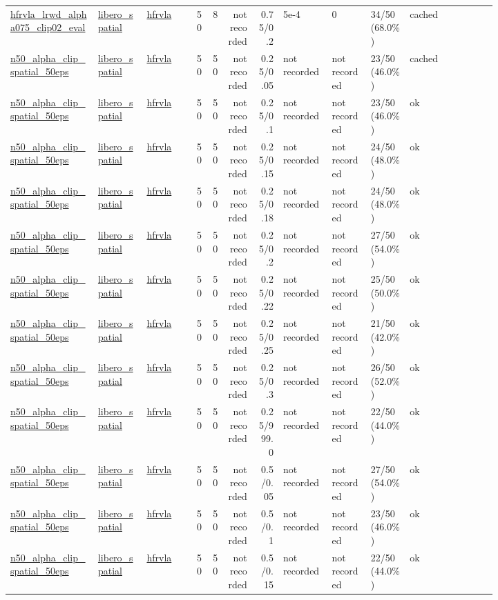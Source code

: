 \begin{tiny}
\begin{longtable}{@{}p{0.18\linewidth}p{0.10\linewidth}p{0.10\linewidth}rrrrp{0.10\linewidth}p{0.08\linewidth}p{0.08\linewidth}p{0.11\linewidth}p{0.07\linewidth}@{}}
\url{hfrvla_lrwd_alpha075_clip02_eval} & \url{libero_spatial} & \url{hfrvla} & 50 & 8 & not recorded & 0.75/0.2 & 5e-4 & 0 & 34/50 (68.0\%) & cached \\
\url{n50_alpha_clip_spatial_50eps} & \url{libero_spatial} & \url{hfrvla} & 50 & 50 & not recorded & 0.25/0.05 & not recorded & not recorded & 23/50 (46.0\%) & cached \\
\url{n50_alpha_clip_spatial_50eps} & \url{libero_spatial} & \url{hfrvla} & 50 & 50 & not recorded & 0.25/0.1 & not recorded & not recorded & 23/50 (46.0\%) & ok \\
\url{n50_alpha_clip_spatial_50eps} & \url{libero_spatial} & \url{hfrvla} & 50 & 50 & not recorded & 0.25/0.15 & not recorded & not recorded & 24/50 (48.0\%) & ok \\
\url{n50_alpha_clip_spatial_50eps} & \url{libero_spatial} & \url{hfrvla} & 50 & 50 & not recorded & 0.25/0.18 & not recorded & not recorded & 24/50 (48.0\%) & ok \\
\url{n50_alpha_clip_spatial_50eps} & \url{libero_spatial} & \url{hfrvla} & 50 & 50 & not recorded & 0.25/0.2 & not recorded & not recorded & 27/50 (54.0\%) & ok \\
\url{n50_alpha_clip_spatial_50eps} & \url{libero_spatial} & \url{hfrvla} & 50 & 50 & not recorded & 0.25/0.22 & not recorded & not recorded & 25/50 (50.0\%) & ok \\
\url{n50_alpha_clip_spatial_50eps} & \url{libero_spatial} & \url{hfrvla} & 50 & 50 & not recorded & 0.25/0.25 & not recorded & not recorded & 21/50 (42.0\%) & ok \\
\url{n50_alpha_clip_spatial_50eps} & \url{libero_spatial} & \url{hfrvla} & 50 & 50 & not recorded & 0.25/0.3 & not recorded & not recorded & 26/50 (52.0\%) & ok \\
\url{n50_alpha_clip_spatial_50eps} & \url{libero_spatial} & \url{hfrvla} & 50 & 50 & not recorded & 0.25/999.0 & not recorded & not recorded & 22/50 (44.0\%) & ok \\
\url{n50_alpha_clip_spatial_50eps} & \url{libero_spatial} & \url{hfrvla} & 50 & 50 & not recorded & 0.5/0.05 & not recorded & not recorded & 27/50 (54.0\%) & ok \\
\url{n50_alpha_clip_spatial_50eps} & \url{libero_spatial} & \url{hfrvla} & 50 & 50 & not recorded & 0.5/0.1 & not recorded & not recorded & 23/50 (46.0\%) & ok \\
\url{n50_alpha_clip_spatial_50eps} & \url{libero_spatial} & \url{hfrvla} & 50 & 50 & not recorded & 0.5/0.15 & not recorded & not recorded & 22/50 (44.0\%) & ok \\

\end{longtable}
\end{tiny}
